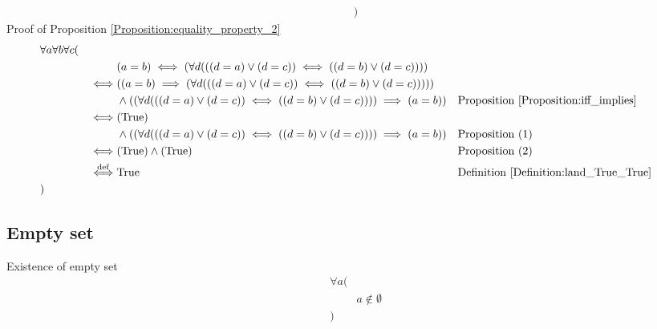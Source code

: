 \begin{prop}
\begin{align*}
& )
\end{align*}
Proof of Proposition \ref{Proposition:equality_property_2}
\begin{align*}
& \forall a \forall b \forall c ( \\
& & & (a = b) \iff (\forall d (((d = a) \lor (d = c)) \iff ((d = b) \lor (d = c)))) \\
& & \iff & ((a = b) \implies (\forall d (((d = a) \lor (d = c)) \iff ((d = b) \lor (d = c))))) \\
& & & \land ((\forall d (((d = a) \lor (d = c)) \iff ((d = b) \lor (d = c)))) \implies (a = b))
& & \text{Proposition \ref{Proposition:iff_implies}} \\
& & \iff & (\text{True}) \\
& & & \land ((\forall d (((d = a) \lor (d = c)) \iff ((d = b) \lor (d = c)))) \implies (a = b))
& & \text{Proposition (1)} \\
& & \iff & (\text{True}) \land (\text{True})
& & \text{Proposition (2)} \\
& & \overset{\operatorname{def}}{\iff} & \text{True}
& & \text{Definition \ref{Definition:land_True_True}} \\
& )
\end{align*}
\end{prop}

\subsection{Empty set}
\begin{axm}
\label{Axiom:existence_of_empty_set}
Existence of empty set
\begin{align*}
& \forall a ( \\
& & a \notin \emptyset \\
& )
\end{align*}
\end{axm}

